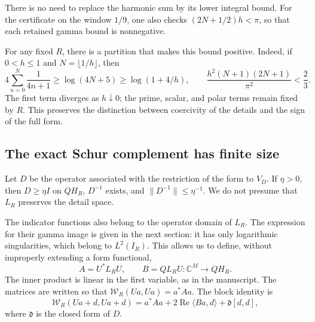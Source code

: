 There is no need to replace the harmonic sum by its lower integral bound.
For the certificate on the window \(1/9\), one also checks
\((2N+1/2)h<\pi\), so that each retained gamma bound is nonnegative.

For any fixed \(R\), there is a partition that makes this
bound positive. Indeed, if \(0<h\leq1\) and \(N=\lfloor1/h\rfloor\), then
\[
4\sum_{n=0}^N\frac1{4n+1}\geq\log(4N+5)\geq\log(1+4/h),
\qquad
\frac{h^2(N+1)(2N+1)}{\pi^2}<\frac23.
\]
The first term diverges as \(h\downarrow0\); the prime,
scalar, and polar terms remain fixed by \(R\). This preserves
the distinction between coercivity of the details and the sign of the
full form.

\subsection{The exact Schur complement has finite size}
\label{schur-add-sub-97}

Let \(D\) be the operator associated with the restriction of the form to \(V_D\).
If \(\eta>0\), then \(D\geq\eta I\) on \(QH_R\),
\(D^{-1}\) exists, and \(\|D^{-1}\|\leq\eta^{-1}\).
We do not presume that \(L_R\) preserves the detail space.

The indicator functions also belong to the operator domain of \(L_R\).
The expression for their gamma image is given in the next section: it has only
logarithmic singularities, which belong to \(L^2(I_R)\).
This allows us to define, without improperly extending a form functional,
\begin{equation}
A=U^*L_RU,\qquad B=QL_RU:\mathbb C^M\longrightarrow QH_R.
\label{schur-add-display-6}
\end{equation}
The inner product is linear in the first variable, as in the
manuscript. The matrices are written so that
\(\mathscr W_R(Ua,Ua)=a^*Aa\). The block identity is
\begin{equation}
\mathscr W_R(Ua+d,Ua+d)
=a^*Aa+2\operatorname{Re}\langle Ba,d\rangle
+\mathfrak d[d,d],
\label{schur-add-display-7}
\end{equation}
where \(\mathfrak d\) is the closed form of \(D\).

